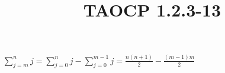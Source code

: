 \documentclass{article}
\title{TAOCP 1.2.3\mbox{-}13}
\begin{document}
\maketitle

\( \sum_{j=m}^{n} j = \sum_{j=0}^{n} j - \sum_{j=0}^{m-1} j = \frac{n(n+1)}{2} - \frac{(m-1)m}{2} \)
\end{document}
